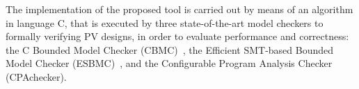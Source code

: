 \documentclass[review]{elsarticle}
\begin{document}
The implementation of the proposed tool is carried out by means of an algorithm in language C, that is executed by three state-of-the-art model checkers to formally verifying PV designs, in order to evaluate performance and correctness: the C Bounded Model Checker (CBMC)~\citep{Kroening}, the Efficient SMT-based Bounded Model Checker (ESBMC)~\citep{esbmc2018}, and the Configurable Program Analysis Checker (CPAchecker).
\end{document}
